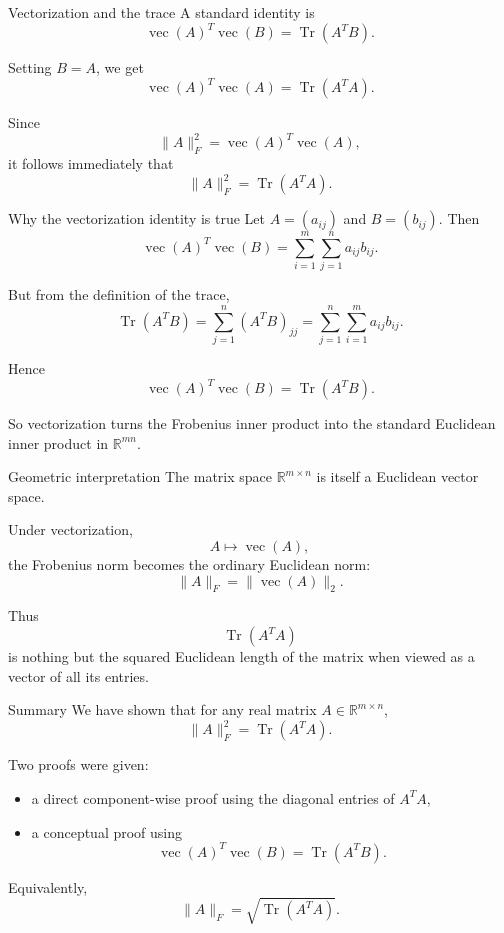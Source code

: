 \documentclass[aspectratio=169]{beamer}
\begin{document}
\begin{frame}{Vectorization and the trace}
A standard identity is
\[
\operatorname{vec}(A)^T\operatorname{vec}(B)=\operatorname{Tr}(A^T B).
\]

Setting \(B=A\), we get
\[
\operatorname{vec}(A)^T\operatorname{vec}(A)=\operatorname{Tr}(A^T A).
\]

Since
\[
\|A\|_F^2=\operatorname{vec}(A)^T\operatorname{vec}(A),
\]
it follows immediately that
\[
\boxed{\|A\|_F^2=\operatorname{Tr}(A^T A)}.
\]
\end{frame}

\begin{frame}{Why the vectorization identity is true}
Let \(A=(a_{ij})\) and \(B=(b_{ij})\). Then
\[
\operatorname{vec}(A)^T\operatorname{vec}(B)
=
\sum_{i=1}^{m}\sum_{j=1}^{n} a_{ij}b_{ij}.
\]

But from the definition of the trace,
\[
\operatorname{Tr}(A^T B)
=
\sum_{j=1}^{n}(A^T B)_{jj}
=
\sum_{j=1}^{n}\sum_{i=1}^{m} a_{ij}b_{ij}.
\]

Hence
\[
\operatorname{vec}(A)^T\operatorname{vec}(B)=\operatorname{Tr}(A^T B).
\]

So vectorization turns the Frobenius inner product into the standard Euclidean inner product in \(\mathbb{R}^{mn}\).
\end{frame}

\begin{frame}{Geometric interpretation}
The matrix space \(\mathbb{R}^{m\times n}\) is itself a Euclidean vector space.

Under vectorization,
\[
A \longmapsto \operatorname{vec}(A),
\]
the Frobenius norm becomes the ordinary Euclidean norm:
\[
\|A\|_F=\|\operatorname{vec}(A)\|_2.
\]

Thus
\[
\operatorname{Tr}(A^T A)
\]
is nothing but the squared Euclidean length of the matrix when viewed as a vector of all its entries.
\end{frame}

\begin{frame}{Summary}
We have shown that for any real matrix \(A\in\mathbb{R}^{m\times n}\),
\[
\boxed{\|A\|_F^2=\operatorname{Tr}(A^T A)}.
\]

Two proofs were given:
\begin{itemize}
\item a direct component-wise proof using the diagonal entries of \(A^T A\),
\item a conceptual proof using
\[
\operatorname{vec}(A)^T\operatorname{vec}(B)=\operatorname{Tr}(A^T B).
\]
\end{itemize}

Equivalently,
\[
\boxed{\|A\|_F=\sqrt{\operatorname{Tr}(A^T A)}}.
\]
\end{frame}
\end{document}
